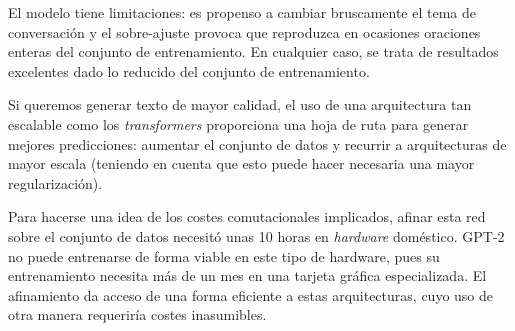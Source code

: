 El modelo tiene limitaciones: es propenso a cambiar bruscamente el tema de conversación y el sobre-ajuste provoca que reproduzca en ocasiones oraciones enteras del conjunto de entrenamiento. En cualquier caso, se trata de resultados excelentes dado lo reducido del conjunto de entrenamiento.

Si queremos generar texto de mayor calidad, el uso de una arquitectura tan escalable como los \textit{transformers} proporciona una hoja de ruta para generar mejores predicciones: aumentar el conjunto de datos y recurrir a arquitecturas de mayor escala (teniendo en cuenta que esto puede hacer necesaria una mayor regularización).

Para hacerse una idea de los costes comutacionales implicados, afinar esta red sobre el conjunto de datos necesitó unas 10 horas en \textit{hardware} doméstico. GPT-2 no puede entrenarse de forma viable en este tipo de hardware, pues su entrenamiento necesita más de un mes en una tarjeta gráfica especializada. El afinamiento da acceso de una forma eficiente a estas arquitecturas, cuyo uso de otra manera requeriría costes inasumibles.
